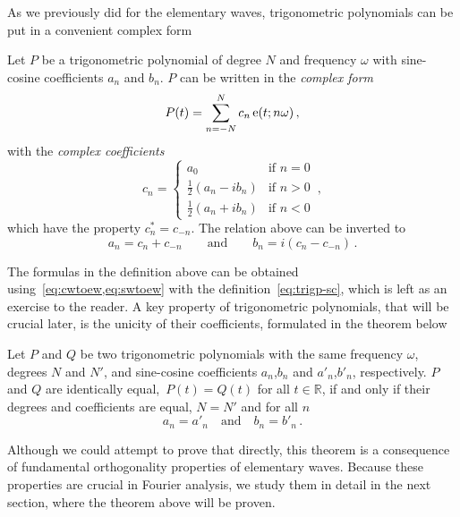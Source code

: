 As we previously did for the elementary waves, trigonometric polynomials can be put in a
convenient complex form
\begin{definition}
  \label{def:trigp-complex}
  Let $P$ be a trigonometric polynomial of degree $N$ and frequency $\omega$ with
  sine-cosine coefficients $a_n$ and $b_n$. $P$ can be written in the \emph{complex form}
  \begin{equation}
    P(t)=\sum_{n=-N}^{N}c_n\operatorname{e}(t;n\omega)\,,\label{eq:trigp-complex}
  \end{equation}
  with the \emph{complex coefficients}
  \begin{equation}
    c_n =
    \begin{cases}
      a_0 &\text{if~}n=0\\
      \frac{1}{2}(a_n-ib_n)&\text{if~}n>0\\
      \frac{1}{2}(a_n+ib_n)&\text{if~}n<0
    \end{cases}
    \,,\label{eq:ab-to-c}
  \end{equation}
  which have the property $c_n^*=c_{-n}$. The relation above can be inverted to
  \begin{equation}
    a_n=c_n+c_{-n}\qquad\text{and}\qquad
    b_n=i(c_n-c_{-n})\,.
  \end{equation}
\end{definition}
The formulas in the definition above can be obtained using~\cref{eq:cwtoew,eq:swtoew} with
the definition~\cref{eq:trigp-sc}, which is left as an exercise to the reader. A key
property of trigonometric polynomials, that will be crucial later, is the unicity of their
coefficients, formulated in the theorem below
\begin{theorem}
  \label{thm:trigp-unicity}
  Let $P$ and $Q$ be two trigonometric polynomials with the same frequency $\omega$,
  degrees $N$ and $N'$, and sine-cosine coefficients $a_n$,$b_n$ and $a'_n$,$b'_n$,
  respectively. $P$ and $Q$ are identically equal,~\ie $P(t)=Q(t)$ for all
  $t\in\mathbb{R}$, if and only if their degrees and coefficients are equal, \ie $N=N'$
  and for all $n$
  \begin{equation}
    a_n=a'_n\quad\text{and}\quad b_n=b'_n\,.
  \end{equation}
\end{theorem}
Although we could attempt to prove that directly, this theorem is a consequence of
fundamental orthogonality properties of elementary waves. Because these properties are
crucial in Fourier analysis, we  study them in detail in the next section, where the
theorem above will be proven.

